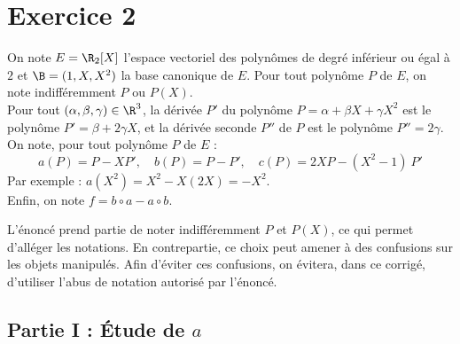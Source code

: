 \documentclass[11pt]{article}%
\begin{document}
\newpage


\section*{Exercice 2}

\noindent
On note $E = \R_2[X]$ l'espace vectoriel des polynômes de degré
inférieur ou égal à $2$ et $\B = (1,X,X^2)$ la base canonique de $E$.
Pour tout polynôme $P$ de $E$, on note indifféremment $P$ ou $P(X)$.\\
Pour tout $(\alpha,\beta,\gamma)\in\R^3$, la dérivée $P'$ du polynôme
$P=\alpha+\beta X+\gamma X^2$ est le polynôme $P' = \beta+2\gamma X$,
et la dérivée seconde $P''$ de $P$ est le polynôme $P'' = 2\gamma$.\\
On note, pour tout polynôme $P$ de $E$ :
\[
a(P) = P-XP', \quad b(P) = P-P', \quad c(P) = 2XP-(X^2-1) \ P'
\]
Par exemple : $a(X^2) = X^2-X(2X) = -X^2$.\\
Enfin, on note $f = b\circ a - a \circ b$.

\begin{remarkL}{.95}%
  L'énoncé prend partie de noter indifféremment $P$ et $P(X)$, ce qui
  permet d'alléger les notations. En contrepartie, ce choix peut
  amener à des confusions sur les objets manipulés. Afin d'éviter ces
  confusions, on évitera, dans ce corrigé, d'utiliser l'abus de
  notation autorisé par l'énoncé.
\end{remarkL}


\subsection*{Partie I : Étude de $a$}
\end{document}
